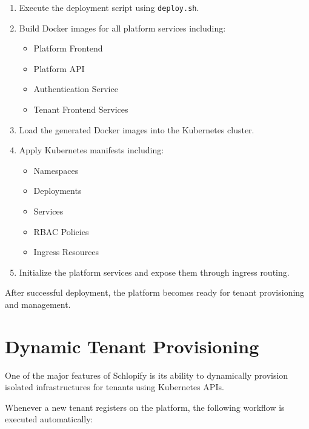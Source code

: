 \documentclass[12pt,a4paper]{report}
\begin{document}
\begin{enumerate}

    \item Execute the deployment script using \texttt{deploy.sh}.

    \item Build Docker images for all platform services including:
    \begin{itemize}
        \item Platform Frontend
        \item Platform API
        \item Authentication Service
        \item Tenant Frontend Services
    \end{itemize}

    \item Load the generated Docker images into the Kubernetes cluster.

    \item Apply Kubernetes manifests including:
    \begin{itemize}
        \item Namespaces
        \item Deployments
        \item Services
        \item RBAC Policies
        \item Ingress Resources
    \end{itemize}

    \item Initialize the platform services and expose them through ingress routing.

\end{enumerate}

After successful deployment, the platform becomes ready for tenant provisioning and management.

\section{Dynamic Tenant Provisioning}

One of the major features of Schlopify is its ability to dynamically provision isolated infrastructures for tenants using Kubernetes APIs.

Whenever a new tenant registers on the platform, the following workflow is executed automatically:
\end{document}
